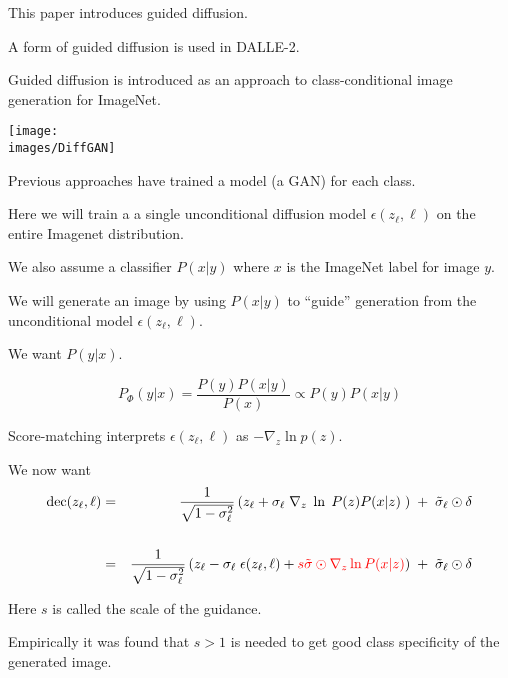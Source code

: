{This paper introduces guided diffusion.

\vfill
A form of guided diffusion is used in DALLE-2.


Guided diffusion is introduced as an approach to class-conditional image generation for ImageNet.

\vfill
\centerline{\texttt{[image: \\images/DiffGAN]}}


Previous approaches have trained a model (a GAN) for each class.

\vfill
Here we will train a a single unconditional diffusion model $\epsilon(z_\ell,\ell)$ on the entire Imagenet distribution.

\vfill
We also assume a classifier $P(x|y)$ where $x$ is the ImageNet label for image $y$.

\vfill
We will generate an image by using $P(x|y)$ to ``guide'' generation from the unconditional model $\epsilon(z_\ell,\ell)$.


We want $P(y|x)$.

\vfill
$$P_\Phi(y|x) = \frac{P(y)P(x|y)}{P(x)} \propto P(y)P(x|y)$$

\vfill
Score-matching interprets $\epsilon(z_\ell,\ell)$ as $- \nabla_z \ln p(z)$.


We now want
{\huge
\begin{eqnarray*}
  \mathrm{dec}(z_\ell,\ell) & = & \frac{1}{\sqrt{1-\sigma_\ell^2}}\left(z_\ell + \sigma_\ell\; \nabla_z \;\ln \;P(z)P(x|z)\;\right)\; +\; \tilde{\sigma}_\ell\odot\delta \\
  \\
  & = & \frac{1}{\sqrt{1-\sigma_\ell^2}}\left(z_\ell - \sigma_\ell\; \epsilon(z_\ell,\ell) + {\color{red} s\tilde{\sigma}\odot\nabla_{z} \ln P(x|z)}\right)\; +\; \tilde{\sigma}_\ell\odot\delta
\end{eqnarray*}
}

\vfill
Here $s$ is called the scale of the guidance.

\vfill
Empirically it was found that $s > 1$ is needed to get good class specificity of the generated image.


}
